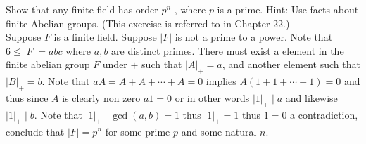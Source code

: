 \documentclass[12pt]{article}
\makeatletter
\theoremstyle{homework}
\newenvironment{exercise}[1]
{\def\@currentlabel{#1}\exercisecore}
{\endexercisecore}
\makeatother
\begin{document}
\begin{exercise}{13.51}
Show that any finite field has order $p^n$ , where $p$ is a prime. Hint: Use facts about finite Abelian groups. (This exercise is referred to in Chapter 22.)\\
Suppose $F$ is a finite field.  Suppose $|F|$ is not a prime to a power.  Note that $6\leq |F|=abc$ where $a,b$ are distinct primes.  There must exist a element in the finite abelian group $F$ under $+$ such that $|A|_+=a$, and another element such that $|B|_+=b$.  Note that $aA=A+A+\cdots+A=0$ implies $A(1+1+\cdots+1)=0$ and thus since $A$ is clearly non zero $a1=0$ or in other words $|1|_+\mid a$ and likewise $|1|_+\mid b$.  Note that $|1|_+\mid \gcd(a,b)=1$ thus $|1|_+=1$ thus $1=0$ a contradiction, conclude that $|F|=p^n$ for some prime $p$ and some natural $n$.
\end{exercise}
\end{document}
